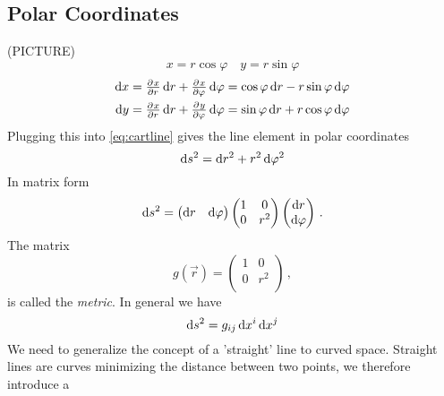 \subsection*{Polar Coordinates}
(PICTURE)
\begin{equation}
    x= r\cos\varphi\quad y= r\sin\varphi
\end{equation}
\begin{align}
    \dif x&= \pd{x}{r}\dif r+\pd{x}{\varphi}\dif \varphi = \cos\varphi\dif r-r\sin\varphi\dif \varphi\\
    \dif y&= \pd{x}{r}\dif r+\pd{y}{\varphi}\dif \varphi = \sin\varphi\dif r+r\cos\varphi\dif \varphi
\end{align}
Plugging this into \eqref{eq:cartline} gives the line element in polar coordinates
\begin{equation}
    \dif s^2=\dif r^2+r^2\dif \varphi^2
\end{equation}
In matrix form
\begin{equation}
    \dif s^2=
    \begin{pmatrix}
        \dif r& \dif \varphi
    \end{pmatrix}
    \begin{pmatrix}
        1& 0\\
        0& r^2\\
    \end{pmatrix}
    \begin{pmatrix}
        \dif r\\ \dif \varphi
    \end{pmatrix}\, .
\end{equation}
The matrix
\begin{equation}
    g(\vec{r})=
    \begin{pmatrix}
        1& 0\\
        0& r^2\\
    \end{pmatrix}\, ,
\end{equation}
is called the \emph{metric}.
In general we have
\begin{equation}
    \dif s^2 = g_{ij}\dif x^i\dif x^j
\end{equation}
We need to generalize the concept of a 'straight' line to curved space. Straight lines are curves minimizing the distance between two points, 
we therefore introduce a
